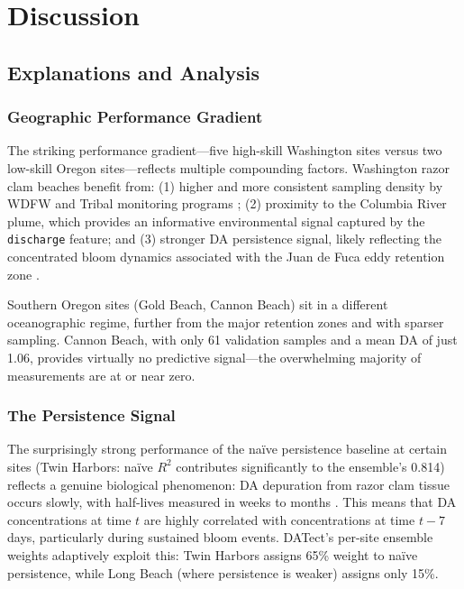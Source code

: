 \documentclass[preprint,12pt,authoryear]{elsarticle}
\begin{document}
\section{Discussion}
\label{sec:discussion}

\subsection{Explanations and Analysis}
\label{sec:discussion-analysis}

\subsubsection{Geographic Performance Gradient}

The striking performance gradient---five high-skill Washington sites versus two low-skill Oregon sites---reflects multiple compounding factors. Washington razor clam beaches benefit from: (1) higher and more consistent sampling density by WDFW and Tribal monitoring programs \citep{McCabe2023}; (2) proximity to the Columbia River plume, which provides an informative environmental signal captured by the \texttt{discharge} feature; and (3) stronger DA persistence signal, likely reflecting the concentrated bloom dynamics associated with the Juan de Fuca eddy retention zone \citep{Trainer2009}.

Southern Oregon sites (Gold Beach, Cannon Beach) sit in a different oceanographic regime, further from the major retention zones and with sparser sampling. Cannon Beach, with only 61 validation samples and a mean DA of just \SI{1.06}{\microgrampeg}, provides virtually no predictive signal---the overwhelming majority of measurements are at or near zero.

\subsubsection{The Persistence Signal}

The surprisingly strong performance of the na\"ive persistence baseline at certain sites (Twin Harbors: na\"ive $R^2$ contributes significantly to the ensemble's 0.814) reflects a genuine biological phenomenon: DA depuration from razor clam tissue occurs slowly, with half-lives measured in weeks to months \citep{Drum1993, Bricelj1998}. This means that DA concentrations at time $t$ are highly correlated with concentrations at time $t - 7$ days, particularly during sustained bloom events. DATect's per-site ensemble weights adaptively exploit this: Twin Harbors assigns 65\% weight to na\"ive persistence, while Long Beach (where persistence is weaker) assigns only 15\%.
\end{document}
